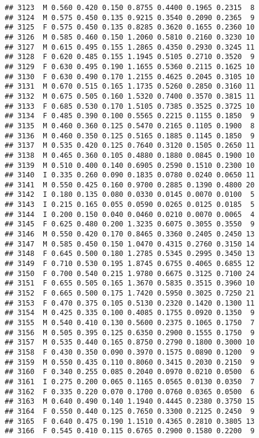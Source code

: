 \documentclass[
]{article}
\begin{document}
\begin{verbatim}
## 3123  M 0.560 0.420 0.150 0.8755 0.4400 0.1965 0.2315  8
## 3124  M 0.575 0.450 0.135 0.9215 0.3540 0.2090 0.2365  9
## 3125  F 0.575 0.450 0.135 0.8285 0.3620 0.1655 0.2360 10
## 3126  M 0.585 0.460 0.150 1.2060 0.5810 0.2160 0.3230 10
## 3127  M 0.615 0.495 0.155 1.2865 0.4350 0.2930 0.3245 11
## 3128  F 0.620 0.485 0.155 1.1945 0.5105 0.2710 0.3520  9
## 3129  F 0.630 0.495 0.190 1.1655 0.5360 0.2115 0.1625 10
## 3130  F 0.630 0.490 0.170 1.2155 0.4625 0.2045 0.3105 10
## 3131  M 0.670 0.515 0.165 1.1735 0.5260 0.2850 0.3160 11
## 3132  M 0.675 0.505 0.160 1.5320 0.7400 0.3570 0.3815 11
## 3133  F 0.685 0.530 0.170 1.5105 0.7385 0.3525 0.3725 10
## 3134  F 0.485 0.390 0.100 0.5565 0.2215 0.1155 0.1850  9
## 3135  M 0.460 0.360 0.125 0.5470 0.2165 0.1105 0.1900  8
## 3136  M 0.460 0.350 0.125 0.5165 0.1885 0.1145 0.1850  9
## 3137  M 0.535 0.420 0.125 0.7640 0.3120 0.1505 0.2650 11
## 3138  M 0.465 0.360 0.105 0.4880 0.1880 0.0845 0.1900 10
## 3139  M 0.510 0.400 0.140 0.6905 0.2590 0.1510 0.2300 10
## 3140  I 0.335 0.260 0.090 0.1835 0.0780 0.0240 0.0650 11
## 3141  M 0.550 0.425 0.160 0.9700 0.2885 0.1390 0.4800 20
## 3142  I 0.180 0.135 0.080 0.0330 0.0145 0.0070 0.0100  5
## 3143  I 0.215 0.165 0.055 0.0590 0.0265 0.0125 0.0185  5
## 3144  I 0.200 0.150 0.040 0.0460 0.0210 0.0070 0.0065  4
## 3145  F 0.625 0.480 0.200 1.3235 0.6075 0.3055 0.3550  9
## 3146  M 0.550 0.420 0.170 0.8465 0.3360 0.2405 0.2450 13
## 3147  M 0.585 0.450 0.150 1.0470 0.4315 0.2760 0.3150 14
## 3148  F 0.645 0.500 0.180 1.2785 0.5345 0.2995 0.3450 13
## 3149  F 0.710 0.530 0.195 1.8745 0.6755 0.4065 0.6855 12
## 3150  F 0.700 0.540 0.215 1.9780 0.6675 0.3125 0.7100 24
## 3151  F 0.655 0.505 0.165 1.3670 0.5835 0.3515 0.3960 10
## 3152  F 0.665 0.500 0.175 1.7420 0.5950 0.3025 0.7250 21
## 3153  F 0.470 0.375 0.105 0.5130 0.2320 0.1420 0.1300 11
## 3154  M 0.425 0.335 0.100 0.4085 0.1755 0.0920 0.1350  9
## 3155  M 0.540 0.410 0.130 0.5600 0.2375 0.1065 0.1750  7
## 3156  M 0.505 0.395 0.125 0.6350 0.2900 0.1555 0.1750  9
## 3157  M 0.535 0.440 0.165 0.8750 0.2790 0.1800 0.3000 10
## 3158  F 0.430 0.350 0.090 0.3970 0.1575 0.0890 0.1200  9
## 3159  M 0.550 0.435 0.110 0.8060 0.3415 0.2030 0.2150  9
## 3160  F 0.340 0.255 0.085 0.2040 0.0970 0.0210 0.0500  6
## 3161  I 0.275 0.200 0.065 0.1165 0.0565 0.0130 0.0350  7
## 3162  F 0.335 0.220 0.070 0.1700 0.0760 0.0365 0.0500  6
## 3163  M 0.640 0.490 0.140 1.1940 0.4445 0.2380 0.3750 15
## 3164  F 0.550 0.440 0.125 0.7650 0.3300 0.2125 0.2450  9
## 3165  F 0.640 0.475 0.190 1.1510 0.4365 0.2810 0.3805 13
## 3166  F 0.545 0.410 0.115 0.6765 0.2900 0.1580 0.2200  9

\end{verbatim}
\end{document}
